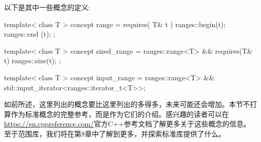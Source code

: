 以下是其中一些概念的定义:

\begin{cpp}
template< class T >
concept range = requires( T& t ) {
	ranges::begin(t);
	ranges::end (t);
};

template< class T >
concept sized_range = ranges::range<T> &&
	requires(T& t) {
		ranges::size(t);
	};

template< class T >
concept input_range = ranges::range<T> &&
	std::input_iterator<ranges::iterator_t<T>>;
\end{cpp}

如前所述，这里列出的概念要比这里列出的多得多，未来可能还会增加。本节不打算作为标准概念的完整参考，而是作为它们的介绍。感兴趣的读者可以在\url{https://en.cppreference.com/}官方C++参考文档了解更多关于这些概念的信息。至于范围库，我们将在第8章中了解到更多，并探索标准库提供了什么。































